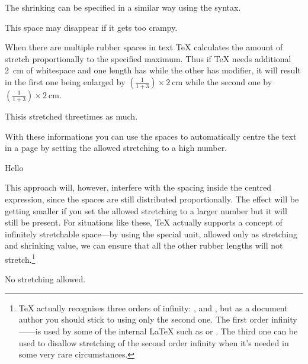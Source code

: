 The shrinking can be specified in a similar way using the  syntax.
\begin{example}
This\hspace{1em minus 2em}%
space may disappear if it gets
too crampy.
\end{example}

When there are multiple rubber spaces in text \TeX{} calculates the amount of
stretch proportionally to the specified maximum. Thus if \TeX{} needs
additional \qty{2}{\cm} of whitespace and one length has  while
the other has  modifier, it will result in the first one being
enlarged by \(\left(\frac{1}{1+3}\right) \times \qty{2}{\cm}\) while the second
one by \(\left(\frac{3}{1+3}\right) \times \qty{2}{\cm}\).
\begin{example}
This\hspace{0pt plus 3cm}is
stretched\hspace{0pt plus 1cm}%
three\linebreak times as much.
\end{example}

With these informations you can use the spaces to automatically centre the text
in a page by setting the allowed stretching to a high number.
\begin{example}
\hspace*{0pt plus 100cm}Hello
\hspace*{0pt plus 100cm}
\linebreak
\end{example}
This approach will, however, interfere with the spacing inside the centred
expression, since the spaces are still distributed proportionally. The effect
will be getting smaller if you set the allowed stretching to a larger number
but it will still be present. For situations like these, \TeX{} actually
supports a concept of infinitely stretchable space---by using the special
 unit, allowed only as stretching and shrinking value, we can
ensure that all the other rubber lengths will not stretch.\footnote{\TeX{}
  actually recognises three orders of infinity: ,  and
  , but as a document author you should stick to using only the
  second one. The first order infinity------is used by some of the
  internal \LaTeX{} such as \cs{\bs} or . The third one can be used
  to disallow stretching of the second order infinity when it's needed in some
  very rare circumstances.}
\begin{example}
\hspace*{0pt plus 1fill}%
No\hspace{0pt plus 100cm}
stretching allowed.%
\hspace*{0pt plus 1fill}%
\linebreak
\end{example}

